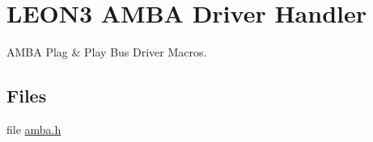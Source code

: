 \hypertarget{group__RTEMSBSPsSPARCLEON3AMBA}{}\section{L\+E\+O\+N3 A\+M\+BA Driver Handler}
\label{group__RTEMSBSPsSPARCLEON3AMBA}


A\+M\+BA Plag \& Play Bus Driver Macros.  


\subsection*{Files}
\begin{DoxyCompactItemize}
\item 
file \mbox{\hyperlink{sparc_2leon3_2include_2amba_8h}{amba.\+h}}
\end{DoxyCompactItemize}
